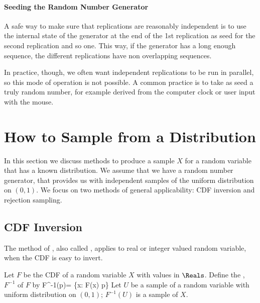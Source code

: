 \paragraph{Seeding the Random Number Generator}
A safe way to make sure that replications are reasonably
independent is to use the internal state of the generator at the
end of the 1st replication as seed for the second replication and
so one. This way, if the generator has a long enough sequence, the
different replications have non overlapping sequences.

In practice, though, we often want independent replications to
be run in parallel, so this mode of operation is not possible.
A common practice is to take as seed a truly random number, for
example derived from the computer clock or user input with the
mouse.

\section{How to Sample from a Distribution}
 In this section we discuss methods to produce a sample $X$
for a random variable that has a known distribution. We assume
that we have a random number generator, that provides us with
independent samples of the uniform distribution on $(0,1)$. We
focus on two methods of general applicability: CDF inversion
and rejection sampling.

\subsection{CDF Inversion}
The method of , also called
, applies to real
or integer valued random variable, when the CDF
is easy to invert.
\begin{shadethm}
Let $F$ be the CDF of a random variable $X$ with values in $\Reals$.
Define the , $F^{-1}$ of $F$ by
 \ben
 F^{-1}(p)= \sup \{x: F(x) \leq p\}
 \een
 Let $U$ be a sample of a random variable with uniform distribution on
 $(0,1)$; $F^{-1}(U)$ is a sample of $X$. \label{theo-cdf-inversion}
\end{shadethm}

